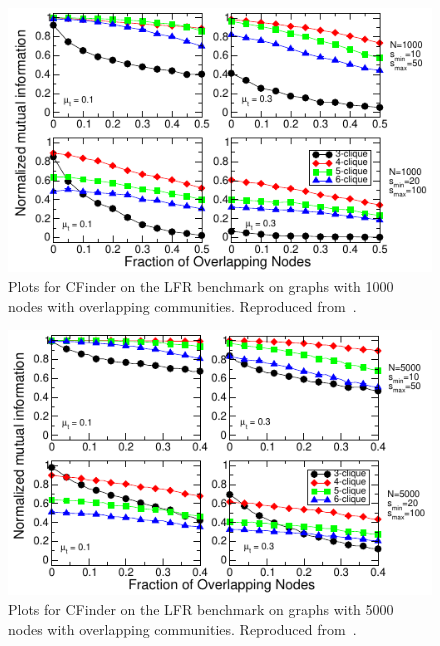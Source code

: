%
%

\begin{figure}
    \centering
    \includegraphics[width=\appcfinderwidth]{lfrpaper/fig6.pdf}
\caption{
        Plots for CFinder on the LFR benchmark on graphs with 1000 nodes 
		with overlapping communities. Reproduced from~\cite{LF09}.
    }\label{fig:CFinder_overlapping1000}
\end{figure}
\begin{figure}
    \centering
    \includegraphics[width=\appcfinderwidth]{lfrpaper/fig7.pdf}
	\caption{
        Plots for CFinder on the LFR benchmark on graphs with 5000 nodes 
		with overlapping communities. Reproduced from~\cite{LF09}.
    }\label{fig:CFinder_overlapping5000}
\end{figure}
    




